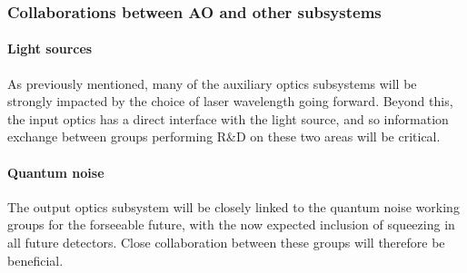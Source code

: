 \subsubsection{Collaborations between AO and other subsystems}
\paragraph{\bf Light sources} As previously mentioned, many of the auxiliary optics subsystems will be strongly impacted by the choice of laser wavelength going forward. Beyond this, the input optics has a direct interface with the light source, and so information exchange between groups performing R\&D on these two areas will be critical.
\paragraph{\bf Quantum noise} The output optics subsystem will be closely linked to the quantum noise working groups for the forseeable future, with the now expected inclusion of squeezing in all future detectors. Close collaboration between these groups will therefore be beneficial.

